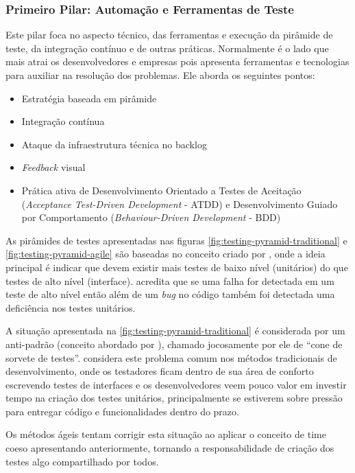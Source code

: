 \documentclass[
	12pt,				%
	openright,			%
	oneside,			%
	a4paper,			%
	english,			%
	brazil,				%
	]{abntex2}
\begin{document}
\subsubsection{Primeiro Pilar: Automação e Ferramentas de Teste}
Este pilar foca no aspecto técnico, das ferramentas e execução da pirâmide de teste, da integração contínuo e de outras práticas. Normalmente é o lado que mais atrai os desenvolvedores e empresas pois apresenta ferramentas e tecnologias para auxiliar na resolução dos problemas. Ele aborda os seguintes pontos:
\begin{itemize}
    \item Estratégia baseada em pirâmide
    \item Integração contínua
    \item Ataque da infraestrutura técnica no backlog %
    \item \emph{Feedback} visual
    \item Prática ativa de Desenvolvimento Orientado a Testes de Aceitação (\emph{Acceptance Test-Driven Development} - ATDD) e Desenvolvimento Guiado por Comportamento (\emph{Behaviour-Driven Development} - BDD) %
\end{itemize}

As pirâmides de testes apresentadas nas figuras \ref{fig:testing-pyramid-traditional} e \ref{fig:testing-pyramid-agile} são baseadas no conceito criado por , onde a ideia principal é indicar que devem existir mais testes de baixo nível (unitários) do que testes de alto nível (interface).  acredita que se uma falha for detectada em um teste de alto nível então além de um \emph{bug} no código também foi detectada uma deficiência nos testes unitários.

A situação apresentada na \autoref{fig:testing-pyramid-traditional} é considerada por  um anti-padrão (conceito abordado por ), chamado jocosamente por ele de ``cone de sorvete de testes''.  considera este problema comum nos métodos tradicionais de desenvolvimento, onde os testadores ficam dentro de sua área de conforto escrevendo testes de interfaces e os desenvolvedores veem pouco valor em investir tempo na criação dos testes unitários, principalmente se estiverem sobre pressão para entregar código e funcionalidades dentro do prazo.

Os métodos ágeis tentam corrigir esta situação ao aplicar o conceito de time coeso apresentando anteriormente, tornando a responsabilidade de criação dos testes algo compartilhado por todos.
\end{document}
